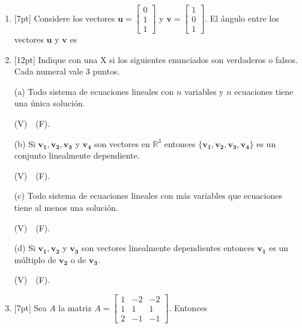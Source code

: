 \documentclass[11pt]{article}
\begin{document}
\begin{enumerate}
\item{}[7pt] Considere los vectores $\mathbf{u} = \begin{bmatrix}0\\1\\1\end{bmatrix}$ y $\mathbf{v} = \begin{bmatrix}1\\0\\1\end{bmatrix}$. El ángulo entre los vectores $\mathbf{u}$ y $\mathbf{v}$ es

\vspace{4pt}
\fbox{\begin{minipage}[t][2.3cm]{\dimexpr\linewidth-2\fboxsep-2\fboxrule}
$\theta = $
\end{minipage}}

\item{}[12pt] Indique con una X si los siguientes enunciados son verdaderos o falsos. Cada numeral vale 3 puntos.

\vspace{6pt}
\noindent (a) Todo sistema de ecuaciones lineales con $n$ variables y $n$ ecuaciones tiene una única solución.

\noindent (V)\ \dotfill\ (F).\ \dotfill

\vspace{6pt}
\noindent (b) Si $\mathbf{v_1}, \mathbf{v_2}, \mathbf{v_3}$ y $\mathbf{v_4}$ son vectores en $\mathbb{R}^3$ entonces $\{\mathbf{v_1},\mathbf{v_2},\mathbf{v_3},\mathbf{v_4}\}$ es un conjunto linealmente dependiente.

\noindent (V)\ \dotfill\ (F).\ \dotfill

\vspace{6pt}
\noindent (c) Todo sistema de ecuaciones lineales con más variables que ecuaciones tiene al menos una solución.

\noindent (V)\ \dotfill\ (F).\ \dotfill

\vspace{6pt}
\noindent (d) Si $\mathbf{v_1}, \mathbf{v_2}$ y $\mathbf{v_3}$ son vectores linealmente dependientes entonces $\mathbf{v_1}$ es un múltiplo de $\mathbf{v_2}$ o de $\mathbf{v_3}$.

\noindent (V)\ \dotfill\ (F).\ \dotfill

\item{}[7pt] Sea $A$ la matriz $A = \begin{bmatrix}1&-2&-2\\1&1&1\\2&-1&-1\end{bmatrix}$. Entonces


\end{enumerate}
\end{document}
